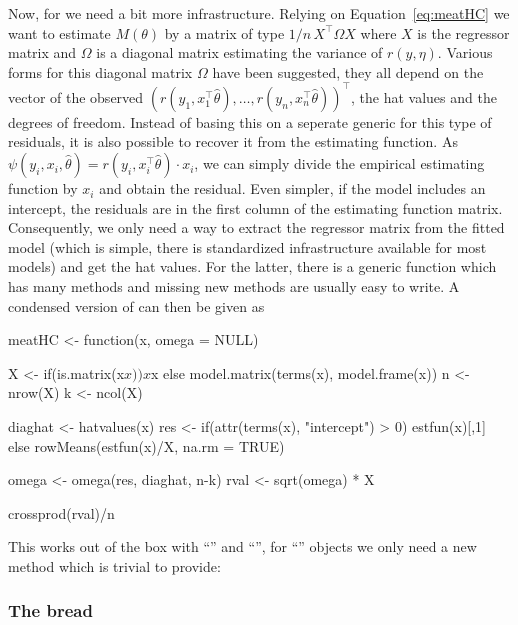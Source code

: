 \documentclass{Z}
\begin{document}
Now, for  we need a bit more infrastructure. Relying on Equation~\ref{eq:meatHC}
we want to estimate $M(\theta)$ by a matrix of type $1/n \, X^\top \Omega X$ where $X$
is the regressor matrix and $\Omega$ is a diagonal matrix estimating the variance of $r(y, \eta)$.
Various forms for this diagonal matrix $\Omega$ have been suggested, they all depend on
the vector of the observed $(r(y_1, x_1^\top \hat \theta), \dots, r(y_n, x_n^\top \hat \theta))^\top$,
the hat values and the degrees of freedom. Instead of basing this on a seperate generic
for this type of residuals, it is also possible to recover it from the estimating function.
As $\psi(y_i, x_i, \hat \theta) = r(y_i, x_i^\top \hat \theta) \cdot x_i$, we can simply 
divide the empirical estimating function by $x_i$ and obtain the residual. Even simpler,
if the model includes an intercept, the residuals are in the first column of the estimating
function matrix. Consequently, we only need a way to extract the regressor matrix from
the fitted model (which is simple, there is standardized infrastructure available for
most models) and get the hat values. For the latter, there is a generic function
 which has many methods and missing new methods are usually easy to
write. A condensed version of  can then be given as
\begin{Schunk}
\begin{Sinput}
meatHC <- function(x, omega = NULL)
{
  X <- if(is.matrix(x$x)) x$x else model.matrix(terms(x), model.frame(x))
  n <- nrow(X)
  k <- ncol(X)

  diaghat <- hatvalues(x)
  res <- if(attr(terms(x), "intercept") > 0) estfun(x)[,1]
           else rowMeans(estfun(x)/X, na.rm = TRUE)
  
  omega <- omega(res, diaghat, n-k)
  rval <- sqrt(omega) * X
  
  crossprod(rval)/n
}
\end{Sinput}
\end{Schunk}
This works out of the box with ``'' and ``'', for ``'' objects
we only need a new  method which is trivial to provide:
\begin{Schunk}
\end{Schunk}


\subsubsection*{The bread}
\end{document}
